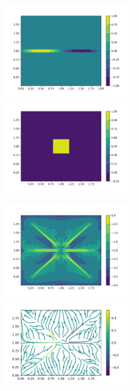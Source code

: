 \documentclass{article}
\theoremstyle{plain}
\theoremstyle{remark}
\theoremstyle{remark}
\theoremstyle{remark}
\numberwithin{equation}{section}
\begin{document}
\begin{figure}
  \includegraphics[width=0.5\textwidth]{3/m1}
  \includegraphics[width=0.5\textwidth]{3/s}
\end{figure}
\begin{figure}
  \includegraphics[width=0.5\textwidth]{3/PCG}
  \includegraphics[width=0.5\textwidth]{3/vector}
\end{figure}
\end{document}
